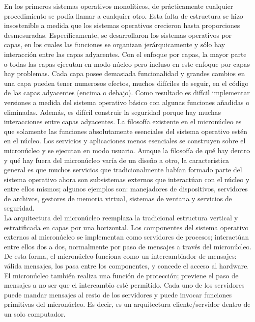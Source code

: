 \documentclass[10pt,a4paper,spanish]{report}
\begin{document}
  \noindent
  En los primeros sistemas operativos monolíticos, de prácticamente cualquier procedimiento se podía llamar a cualquier otro. Esta falta de estructura se hizo insostenible a medida que los sistemas operativos crecieron hasta proporciones desmesuradas. Específicamente, se desarrollaron los sistemas operativos por capas, en los cuales las funciones se organizan jerárquicamente y sólo hay interacción entre las capas adyacentes. Con el enfoque por capas, la mayor parte o todas las capas ejecutan en modo núcleo pero incluso en este enfoque por capas hay problemas. Cada capa posee demasiada funcionalidad y grandes cambios en una capa pueden tener numerosos efectos, muchos difíciles de seguir, en el código de las capas adyacentes (encima o debajo). Como resultado es difícil implementar versiones a medida del sistema operativo básico con algunas funciones añadidas o eliminadas. Además, es difícil construir la seguridad porque hay muchas interacciones entre capas adyacentes. La filosofía existente en el micronúcleo es que solamente las funciones absolutamente esenciales del sistema operativo estén en el núcleo. Los servicios y aplicaciones menos esenciales se construyen sobre el micronúcleo y se ejecutan en modo usuario. Aunque la filosofía de qué hay dentro y qué hay fuera del micronúcleo varía de un diseño a otro, la característica general es que muchos servicios que tradicionalmente habían formado parte del sistema operativo ahora son subsistemas externos que interactúan con el núcleo y entre ellos mismos; algunos ejemplos son: manejadores de dispositivos, servidores de archivos, gestores de memoria virtual, sistemas de ventana y servicios de seguridad. \\

  \noindent
  La arquitectura del micronúcleo reemplaza la tradicional estructura vertical y estratificada en capas por una horizontal. Los componentes del sistema operativo externos al micronúcleo se implementan como servidores de procesos; interactúan entre ellos dos a dos, normalmente por paso de mensajes a través del micronúcleo. De esta forma, el micronúcleo funciona como un intercambiador de mensajes: válida mensajes, los pasa entre los componentes, y concede el acceso al hardware. El micronúcleo también realiza una función de protección; previene el paso de mensajes a no ser que el intercambio esté permitido. Cada uno de los servidores puede mandar mensajes al resto de los servidores y puede invocar funciones primitivas del micronúcleo. Es decir, es un arquitectura cliente/servidor dentro de un solo computador.
\end{document}

